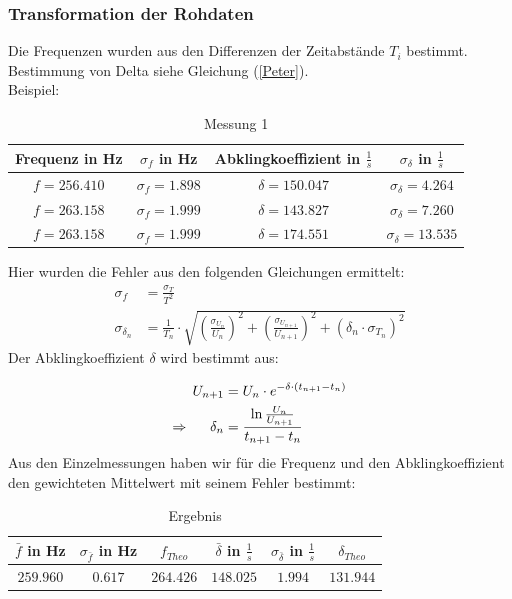 \documentclass[12pt,a4paper]{article}
\begin{document}
\newpage
\subsubsection{Transformation der Rohdaten}
Die Frequenzen wurden aus den Differenzen der Zeitabstände $T_i$ bestimmt. Bestimmung von Delta siehe Gleichung (\ref{Peter}). \\
Beispiel:

\begin{table}[H]\centering
\caption{Messung 1}
\begin{tabular}{c|c|c|c}
Frequenz in Hz & $\sigma_f$ in Hz & Abklingkoeffizient in $\frac{1}{s}$ & $\sigma_{\delta}$ in $\frac{1}{s}$\\ 
\hline
$f=256.410$& $\sigma_f=1.898$& $\delta=150.047$& $\sigma_{\delta}=4.264$\\ 
$f=263.158$& $\sigma_f=1.999$& $\delta=143.827$& $\sigma_{\delta}=7.260$\\
$f=263.158$& $\sigma_f=1.999$& $\delta=174.551$& $\sigma_{\delta}=13.535$\\
\end{tabular} 
\end{table}
Hier wurden die Fehler aus den folgenden Gleichungen ermittelt:
\begin{align}
\sigma_f&=\frac{\sigma_T}{T^2}\\
\sigma_{\delta_n}&=\frac{1}{T_n}\cdot \sqrt{(\frac{\sigma_{U_n}}{U_n})^2+(\frac{\sigma_{U_{n+1}}}{U_{n+1}})^2+(\delta_n\cdot \sigma_{T_n})^2}
\end{align}
Der Abklingkoeffizient $\delta$ wird bestimmt aus:

\begin{align}
U_{n+1}&=U_n \cdot e^{-\delta \cdot (t_{n+1}-t_n)}\notag \\
\Rightarrow \hspace{0.5cm} \delta_n&=\frac{\ln{\frac{U_n}{U_{n+1}}}}{t_{n+1}-t_n}
\label{Peter}
\end{align}
\newline
Aus den Einzelmessungen haben wir für die Frequenz und den Abklingkoeffizient den gewichteten Mittelwert mit seinem Fehler bestimmt:

\begin{table}[H]\centering
\caption{Ergebnis}
\begin{tabular}{c|c|c|c|c|c}
$\bar{f}$ in Hz & $\sigma_{\bar{f}}$ in Hz & $f_{Theo}$ & $\bar{\delta}$ in $\frac{1}{s}$ & $\sigma_{\bar{\delta}}$ in $\frac{1}{s}$& $\delta_{Theo}$ \\ 
\hline
$259.960$& $0.617$ & $264.426$ & $148.025$& $1.994$& $131.944$\\ 
\end{tabular} 
\end{table}
\end{document}

